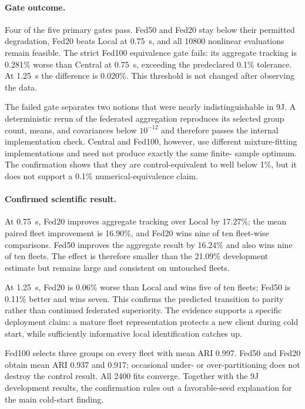 \paragraph{Gate outcome.}
Four of the five primary gates pass. Fed50 and Fed20 stay below their permitted
degradation, Fed20 beats Local at 0.75~s, and all 10800 nonlinear evaluations
remain feasible. The strict Fed100 equivalence gate fails: its aggregate
tracking is 0.281\% worse than Central at 0.75~s, exceeding the predeclared
0.1\% tolerance. At 1.25~s the difference is 0.020\%. This threshold is not
changed after observing the data.

The failed gate separates two notions that were nearly indistinguishable in
9J. A deterministic rerun of the federated aggregation reproduces its selected
group count, means, and covariances below $10^{-12}$ and therefore passes the
internal implementation check. Central and Fed100, however, use different
mixture-fitting implementations and need not produce exactly the same finite-
sample optimum. The confirmation shows that they are control-equivalent to
well below 1\%, but it does not support a 0.1\% numerical-equivalence claim.

\paragraph{Confirmed scientific result.}
At 0.75~s, Fed20 improves aggregate tracking over Local by 17.27\%; the mean
paired fleet improvement is 16.90\%, and Fed20 wins nine of ten fleet-wise
comparisons. Fed50 improves the aggregate result by 16.24\% and also wins nine
of ten fleets. The effect is therefore smaller than the 21.09\% development
estimate but remains large and consistent on untouched fleets.

At 1.25~s, Fed20 is 0.06\% worse than Local and wins five of ten fleets; Fed50
is 0.11\% better and wins seven. This confirms the predicted transition to
parity rather than continued federated superiority. The evidence supports a
specific deployment claim: a mature fleet representation protects a new client
during cold start, while sufficiently informative local identification catches
up.

Fed100 selects three groups on every fleet with mean ARI 0.997. Fed50 and Fed20
obtain mean ARI 0.937 and 0.917; occasional under- or over-partitioning does not
destroy the control result. All 2400 fits converge. Together with the 9J
development results, the confirmation rules out a favorable-seed explanation
for the main cold-start finding.

